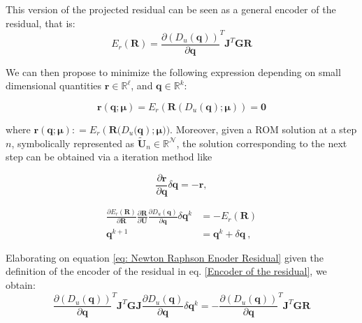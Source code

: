 This version of the projected residual can be seen as a general encoder of the residual, that is:
\begin{equation}
    E_r (\mathbf{R}) = \frac{\partial (D_u(\mathbf{q}))}{\partial \mathbf{q}}^T \mathbf{J}^T\mathbf{G} \mathbf{R}
    \label{Encoder of the residual}
\end{equation}

We can then propose to minimize the following expression depending on small dimensional quantities $\mathbf{r} \in \mathbb{R}^\ell$, and $\mathbf{q} \in \mathbb{R}^k$:

\begin{equation}
    \mathbf{r}(\mathbf{q}; \boldsymbol{\mu})= E_r\left(\mathbf{R}(D_u(\mathbf{q}) ; \boldsymbol{\mu}) \right) = \boldsymbol{0}
\end{equation}

\noindent where $\mathbf{r}(\mathbf{q}; \boldsymbol{\mu}) : = E_r\left(\mathbf{R}(D_u(\mathbf{q}\right) ; \boldsymbol{\mu}) )$. Moreover, given a ROM solution at a step $n$, symbolically represented as $\tilde{\mathbf{U}}_n \in \mathbb{R}^{\mathcal{N}}$, the solution corresponding to the next step can be obtained via a iteration method like

\begin{equation}
    \frac{\partial{\mathbf{r}}}{\partial{\mathbf{q}}} \delta \mathbf{q}=-\mathbf{r},
    \label{iteration method}
\end{equation}

\begin{subequations}
\begin{align}
\frac{\partial E_r(\mathbf{R})}{\partial \mathbf{R}} 
\frac{\partial \mathbf{R}}{\partial \mathbf{U}}\frac{\partial D_u(\mathbf{q})}{\partial \mathbf{q}} \delta \mathbf{q}^{k} & =   - E_r\left(\mathbf{R} \right)
\label{eq: Newton Raphson Enoder Residual}  \\
\mathbf{q}^{k+1} & = \mathbf{q}^{k} + \delta\mathbf{q} \ ,
\end{align}
\end{subequations}

Elaborating on equation \ref{eq: Newton Raphson Enoder Residual} given the definition of the encoder of the residual in eq. \ref{Encoder of the residual}, we obtain:
\begin{equation}
    \frac{\partial (D_u(\mathbf{q}))}{\partial \mathbf{q}}^T \mathbf{J}^T\mathbf{G} \mathbf{J} \frac{\partial D_u(\mathbf{q})}{\partial \mathbf{q}} \delta \mathbf{q}^{k} =   - \frac{\partial (D_u(\mathbf{q}))}{\partial \mathbf{q}}^T \mathbf{J}^T\mathbf{G} \mathbf{R}
    \label{eq:prom_general}
\end{equation}

